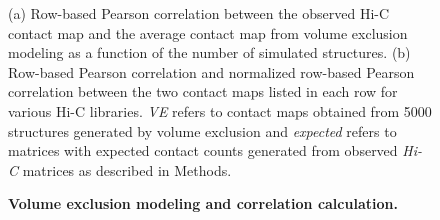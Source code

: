 \documentclass{article}
\begin{document}
\begin{figure}
  \begin{center}
  \hspace{0.03\textwidth}
  \end{center}
\caption{{\bf Volume exclusion modeling and correlation calculation.}}
{ (a) Row-based Pearson correlation between the observed Hi-C contact map
    and the average contact map from volume exclusion modeling as a function
    of the number of simulated structures.
    (b) Row-based Pearson correlation and normalized row-based Pearson
    correlation between the two contact maps listed in each row for
    various Hi-C libraries. \emph{VE} refers to
    contact maps obtained from 5000 structures generated by volume exclusion
    and \emph{expected} refers to matrices with expected contact counts
    generated from observed \emph{Hi-C} matrices as described in Methods.
    }
\label{suppfig:VEconvergence}
\end{figure}
\clearpage
\end{document}
